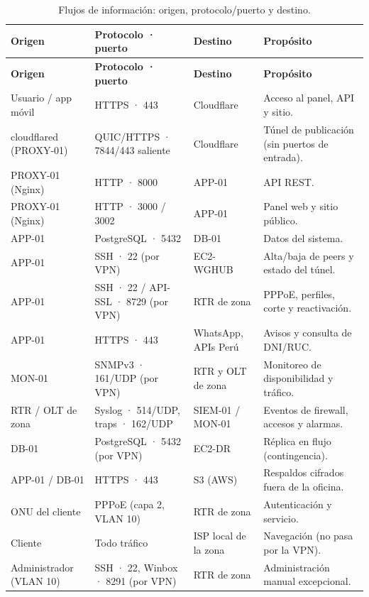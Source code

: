 {\small
\begin{longtable}{L{3cm}L{3.1cm}L{3.3cm}L{4.3cm}}
\caption{Flujos de información: origen, protocolo/puerto y destino.}\label{tab:ce03-flujos}\\
\toprule
\textbf{Origen} & \textbf{Protocolo · puerto} & \textbf{Destino} & \textbf{Propósito} \\
\midrule
\endfirsthead
\toprule
\textbf{Origen} & \textbf{Protocolo · puerto} & \textbf{Destino} & \textbf{Propósito} \\
\midrule
\endhead
\bottomrule
\endlastfoot
Usuario / app móvil & HTTPS · 443 & Cloudflare & Acceso al panel, API y sitio. \\
cloudflared (PROXY-01) & QUIC/HTTPS · 7844/443 saliente & Cloudflare & Túnel de publicación (sin puertos de entrada). \\
PROXY-01 (Nginx) & HTTP · 8000 & APP-01 & API REST. \\
PROXY-01 (Nginx) & HTTP · 3000 / 3002 & APP-01 & Panel web y sitio público. \\
APP-01 & PostgreSQL · 5432 & DB-01 & Datos del sistema. \\
APP-01 & SSH · 22 (por VPN) & EC2-WGHUB & Alta/baja de peers y estado del túnel. \\
APP-01 & SSH · 22 / API-SSL · 8729 (por VPN) & RTR de zona & PPPoE, perfiles, corte y reactivación. \\
APP-01 & HTTPS · 443 & WhatsApp, APIs Perú & Avisos y consulta de DNI/RUC. \\
MON-01 & SNMPv3 · 161/UDP (por VPN) & RTR y OLT de zona & Monitoreo de disponibilidad y tráfico. \\
RTR / OLT de zona & Syslog · 514/UDP, traps · 162/UDP & SIEM-01 / MON-01 & Eventos de firewall, accesos y alarmas. \\
DB-01 & PostgreSQL · 5432 (por VPN) & EC2-DR & Réplica en flujo (contingencia). \\
APP-01 / DB-01 & HTTPS · 443 & S3 (AWS) & Respaldos cifrados fuera de la oficina. \\
ONU del cliente & PPPoE (capa 2, VLAN 10) & RTR de zona & Autenticación y servicio. \\
Cliente & Todo tráfico & ISP local de la zona & Navegación (no pasa por la VPN). \\
Administrador (VLAN 10) & SSH · 22, Winbox · 8291 (por VPN) & RTR de zona & Administración manual excepcional. \\
\end{longtable}
}

